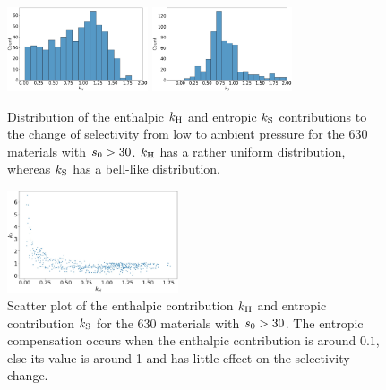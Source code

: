 \documentclass[main.tex]{subfiles}
\begin{document}
\begin{figure}[t]
  \centering
    \includegraphics[width=0.37\textwidth]{figures/2-thermo/k_H.jpg}
    \hspace{8mm}
    \includegraphics[width=0.37\textwidth]{figures/2-thermo/k_S.jpg}
    \caption{Distribution of the enthalpic $k_{\text{H}}$ and entropic $k_{\text{S}}$ contributions to the change of selectivity from low to ambient pressure for the 630 materials with $s_{\text{0}}>30$. $k_{\text{H}}$ has a rather uniform distribution, whereas $k_{\text{S}}$ has a bell-like distribution. }
    \label{fgr:distk}
  \end{figure}
  
  \begin{figure}[t]
  \centering
    \includegraphics[width=0.45\textwidth]{figures/2-thermo/k_S_vs_k_H.jpg}
    \caption{Scatter plot of the enthalpic contribution $k_{\text{H}}$ and entropic contribution $k_{\text{S}}$ for the 630 materials with $s_{\text{0}}>30$. The entropic compensation occurs when the enthalpic contribution is around $0.1$, else its value is around 1 and has little effect on the selectivity change.}
    \label{fgr:scatterk}
  \end{figure}
  
\end{document}
